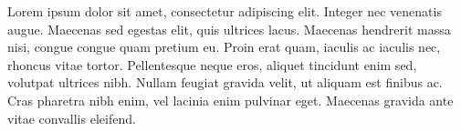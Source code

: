 \pagestyle{empty}
\hfill

\vfill

\begin{flushright}
Lorem ipsum dolor sit amet, consectetur adipiscing elit. Integer nec venenatis augue. Maecenas sed egestas elit, quis ultrices lacus. Maecenas hendrerit massa nisi, congue congue quam pretium eu. Proin erat quam, iaculis ac iaculis nec, rhoncus vitae tortor. Pellentesque neque eros, aliquet tincidunt enim sed, volutpat ultrices nibh. Nullam feugiat gravida velit, ut aliquam est finibus ac. Cras pharetra nibh enim, vel lacinia enim pulvinar eget. Maecenas gravida ante vitae convallis eleifend. 
\end{flushright} 
